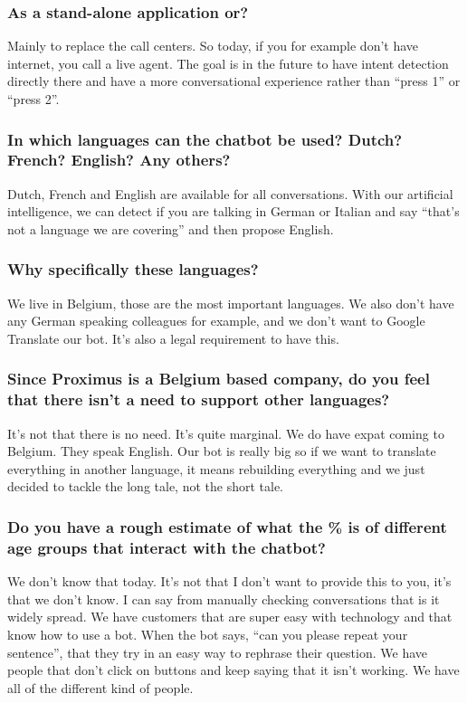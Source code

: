\begin{appendices}
	\subsubsection{As a stand-alone application or?}
	Mainly to replace the call centers. So today, if you for example don’t have internet, you call a live agent. The goal is in the future to have intent detection directly there and have a more conversational experience rather than “press 1” or “press 2”.
	
	\subsubsection{In which languages can the chatbot be used? Dutch? French? English? Any others?}
	Dutch, French and English are available for all conversations. With our artificial intelligence, we can detect if you are talking in German or Italian and say “that’s not a language we are covering” and then propose English.
	
	\subsubsection{Why specifically these languages?}
	We live in Belgium, those are the most important languages. We also don’t have any German speaking colleagues for example, and we don’t want to Google Translate our bot. It’s also a legal requirement to have this.
	
	\subsubsection{Since Proximus is a Belgium based company, do you feel that there isn’t a need to support other languages?}
	It’s not that there is no need. It’s quite marginal. We do have expat coming to Belgium. They speak English. Our bot is really big so if we want to translate everything in another language, it means rebuilding everything and we just decided to tackle the long tale, not the short tale.
	
	\subsubsection{Do you have a rough estimate of what the \% is of different age groups that interact with the chatbot?}
	We don’t know that today. It’s not that I don’t want to provide this to you, it’s that we don’t know. I can say from manually checking conversations that is it widely spread. We have customers that are super easy with technology and that know how to use a bot. When the bot says, “can you please repeat your sentence”, that they try in an easy way to rephrase their question. We have people that don’t click on buttons and keep saying that it isn’t working. We have all of the different kind of people.
	

\end{appendices}

